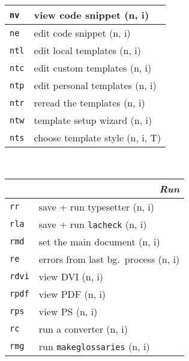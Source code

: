 \documentclass[oneside,10pt,landscape,DIV16]{scrartcl}
\newcommand{\Map}[1] {\textbf{\textasciiacute}\texttt{#1}}
\begin{document}
\begin{multicols}{3}
\begin{center}
\begin{tabular}[]{|p{11mm}|p{60mm}|}
\hline \Map{nv}  & view code snippet         \hfill (n, i)   \\
\hline \Map{ne}  & edit code snippet         \hfill (n, i)   \\
\hline
\hline \Map{ntl} & edit local templates      \hfill (n, i)   \\
\hline \Map{ntc} & edit custom templates     \hfill (n, i)   \\
\hline \Map{ntp} & edit personal templates   \hfill (n, i)   \\
\hline \Map{ntr} & reread the templates      \hfill (n, i)   \\
\hline \Map{ntw} & template setup wizard     \hfill (n, i)   \\
\hline \Map{nts} & choose template style     \hfill (n, i, T)\\
\hline
%
\end{tabular}\\
%
\begin{tabular}[]{|p{11mm}|p{62mm}|}
\hline
\multicolumn{2}{|r|}{\textsl{\textbf{R}un}} \\[1.0ex]
\hline \Map{rr}   & save + run typesetter                    \hfill (n, i)\\
\hline \Map{rla}  & save + run \texttt{lacheck}              \hfill (n, i)\\
\hline \Map{rmd}  & set the main document                    \hfill (n, i)\\
\hline \Map{re}   & errors from last bg.\ process            \hfill (n, i)\\
\hline \Map{rdvi} & view DVI                                 \hfill (n, i)\\
\hline \Map{rpdf} & view PDF                                 \hfill (n, i)\\
\hline \Map{rps}  & view PS                                  \hfill (n, i)\\
\hline \Map{rc}   & run a converter                          \hfill (n, i)\\
\hline
\hline \Map{rmg}  & run \texttt{makeglossaries}              \hfill (n, i)\\

\end{tabular}
\end{center}
\end{multicols}
\end{document}
